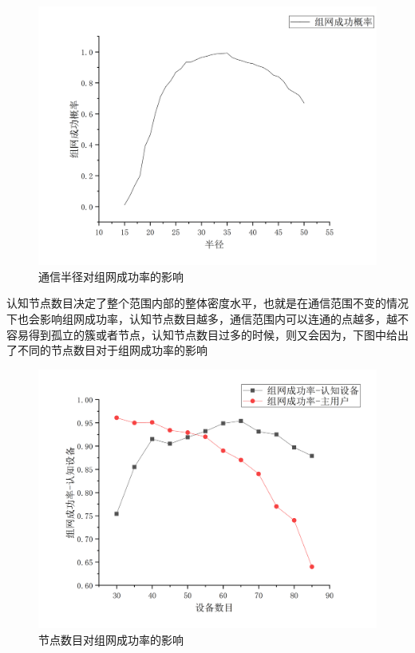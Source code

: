 \documentclass[a4paper,AutoFakeBold,oneside,12pt]{book}
\begin{document}
  \begin{figure}[htbp]
\centering %
\includegraphics[scale=0.3]{pictures/R-successp.png} 
\caption{通信半径对组网成功率的影响} %
\label{R-successp}
\end{figure}
  
  认知节点数目决定了整个范围内部的整体密度水平，也就是在通信范围不变的情况下也会影响组网成功率，认知节点数目越多，通信范围内可以连通的点越多，越不容易得到孤立的簇或者节点，认知节点数目过多的时候，则又会因为，下图中给出了不同的节点数目对于组网成功率的影响
    \begin{figure}[htbp]
\centering %
\includegraphics[scale=0.3]{pictures/CRPU-SUCCESS.png} 
\caption{节点数目对组网成功率的影响} %
\label{CRPU-SUCCESS}
\end{figure}
\end{document}
